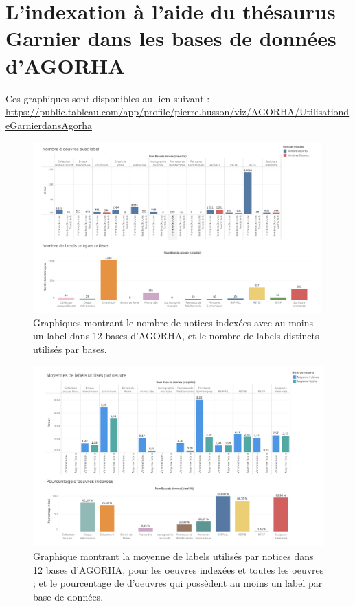 \section[L'indexation dans AGORHA]{L'indexation à l'aide du thésaurus Garnier dans les bases de données d'AGORHA}

Ces graphiques sont disponibles au lien suivant : \url{https://public.tableau.com/app/profile/pierre.husson/viz/AGORHA/UtilisationdeGarnierdansAgorha}


\begin{figure}[H]
    \centering
    \includegraphics[height=0.4\textheight]{annexes/stats/graphiqueGarnier1A.png}
    \caption{Graphiques montrant le nombre de notices indexées avec au moins un label dans 12 bases d'AGORHA, et le nombre de labels distincts utilisés par bases.}
    \label{stat:Garnier1A}
\end{figure}


\begin{figure}[H]
    \centering
    \includegraphics[height=0.4\textheight]{annexes/stats/graphiqueGarnier1B.png}
    \caption{Graphique montrant la moyenne de labels utilisés par notices dans 12 bases d'AGORHA, pour les oeuvres indexées et toutes les oeuvres ; et le pourcentage de d'oeuvres qui possèdent au moins un label par base de données.}
    \label{stat:Garnier1B}
\end{figure}


